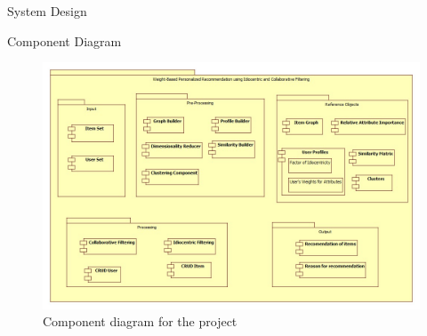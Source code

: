 \documentclass{report}
\begin{document}
\begin{projChapter}{System Design}
\begin{projSection}{Component Diagram}
\begin{figure}[ht!]
\centering
\includegraphics[scale=0.4]{images/component.png}
\caption{Component diagram for the project}
\label{component}
\end{figure}


\end{projSection}
\end{projChapter}
\end{document}
